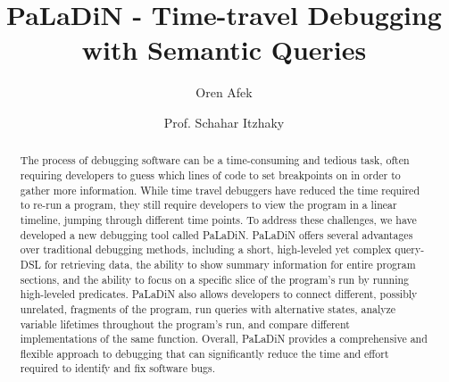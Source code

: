 \documentclass[sigconf,review]{acmart}
\begin{document}
    \title{PaLaDiN - Time-travel Debugging with Semantic Queries}

    \author{Oren Afek}

    \author{Prof. Schahar Itzhaky}


    \renewcommand{\shortauthors}{Trovato and Tobin, et al.}

    \begin{abstract}
        The process of debugging software can be a time-consuming and tedious task, often requiring developers to guess which lines of code to set breakpoints on in order to gather more information. While time travel debuggers have reduced the time required to re-run a program, they still require developers to view the program in a linear timeline, jumping through different time points. To address these challenges, we have developed a new debugging tool called PaLaDiN. PaLaDiN offers several advantages over traditional debugging methods, including a short, high-leveled yet complex query-DSL for retrieving data, the ability to show summary information for entire program sections, and the ability to focus on a specific slice of the program's run by running high-leveled predicates. PaLaDiN also allows developers to connect different, possibly unrelated, fragments of the program, run queries with alternative states, analyze variable lifetimes throughout the program's run, and compare different implementations of the same function. Overall, PaLaDiN provides a comprehensive and flexible approach to debugging that can significantly reduce the time and effort required to identify and fix software bugs.
    \end{abstract}
\end{document}
